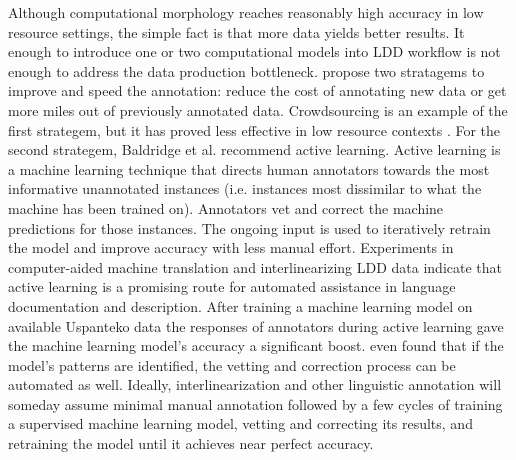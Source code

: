 \documentclass[12pt]{article}
\newcommand{\note}[4][]{\todo[author=#2,color=#3,size=\scriptsize,fancyline,caption={},#1]{#4}}
\newcommand{\mans}[2][]{\note[#1]{MH}{blue!40}{#2}{}}
\begin{document}
Although computational morphology reaches reasonably high accuracy in low resource settings, the simple fact is that more data yields better results. It enough to introduce one or two computational models into LDD workflow is not enough to address the data production bottleneck.\mans{???}  propose two stratagems to improve and speed the annotation: reduce the cost of annotating new data or get more miles out of previously annotated data. Crowdsourcing is an example of the first strategem, but it has proved less effective in low resource contexts \cite{bird_aikuma:_2014,bettinson_developing_2017}. For the second strategem, Baldridge et al. recommend active learning. Active learning is a machine learning technique that directs human annotators towards the most informative unannotated instances (i.e. instances most dissimilar to what the machine has been trained on). Annotators vet and correct the machine predictions for those instances. The ongoing input is used to iteratively retrain the model and improve accuracy with less manual effort. Experiments in computer-aided machine translation \cite{kothur_document-level_2018} and interlinearizing LDD data \cite{palmer_semi-automated_2009,palmer_evaluating_2009,palmer_computational_2010} indicate that active learning is a promising route for automated assistance in language documentation and description. After training a machine learning model on available Uspanteko data \cite{palmer_semi-automated_2009} the responses of annotators during active learning gave the machine learning model's accuracy a significant boost.  even found that if the model's patterns are identified, the vetting and correction process can be automated as well. Ideally, interlinearization and other linguistic annotation will someday assume  minimal manual annotation followed by a few cycles of training a supervised machine learning model, vetting and correcting its results, and retraining the model until it achieves near perfect accuracy. 
\end{document}

